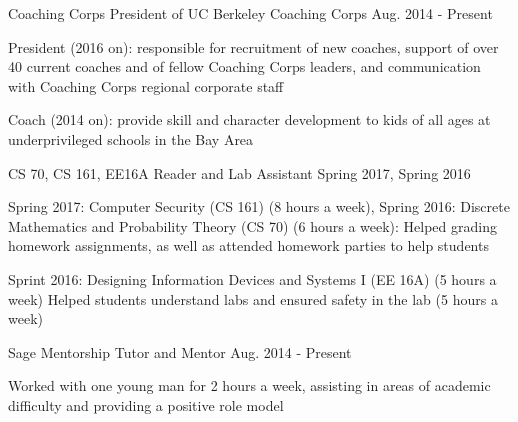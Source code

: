 \begin{cventries}
  \cventry
    {Coaching Corps} %
    {President of UC Berkeley Coaching Corps} %
    {Aug. 2014 - Present} %
    {} %
    {
      \begin{cvitems} %
        \item {President (2016 on): responsible for recruitment of new coaches, support of over 40 current coaches and of fellow Coaching Corps leaders, and communication with Coaching Corps regional corporate staff}
        \item {Coach (2014 on): provide skill and character development to kids of all ages at underprivileged schools in the Bay Area}
      \end{cvitems}
    }
  \cventry
    {CS 70, CS 161, EE16A} %
    {Reader and Lab Assistant} %
    {Spring 2017, Spring 2016} %
    {} %
    {
      \begin{cvitems} %
        \item {Spring 2017: Computer Security (CS 161) (8 hours a week), Spring 2016: Discrete Mathematics and Probability Theory (CS 70) (6 hours a week): Helped grading homework assignments, as well as attended homework parties to help students}
         \item {Sprint 2016: Designing Information Devices and Systems I (EE 16A) (5 hours a week) Helped students understand labs and ensured safety in the lab (5 hours a week)}
      \end{cvitems}
    }

 
   \cventry
    {Sage Mentorship} %
    {Tutor and Mentor} %
    {Aug. 2014 - Present} %
    {} %
    {
      \begin{cvitems} %
        \item {Worked with one young man for 2 hours a week, assisting in areas of academic difficulty and providing a positive role model}
      \end{cvitems}
     }
\end{cventries}
